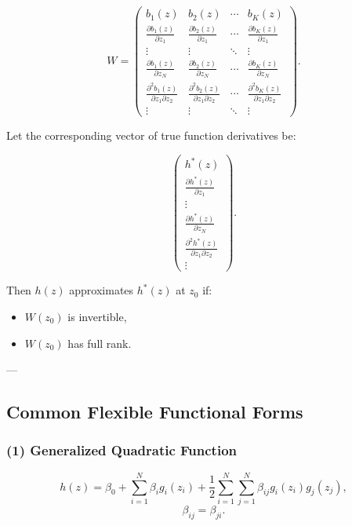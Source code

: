 \[
W =
\begin{pmatrix}
b_1(z) & b_2(z) & \cdots & b_K(z) \\
\frac{\partial b_1(z)}{\partial z_1} & \frac{\partial b_2(z)}{\partial z_1} & \cdots & \frac{\partial b_K(z)}{\partial z_1} \\
\vdots & \vdots & \ddots & \vdots \\
\frac{\partial b_1(z)}{\partial z_N} & \frac{\partial b_2(z)}{\partial z_N} & \cdots & \frac{\partial b_K(z)}{\partial z_N} \\
\frac{\partial^2 b_1(z)}{\partial z_1 \partial z_2} & \frac{\partial^2 b_2(z)}{\partial z_1 \partial z_2} & \cdots & \frac{\partial^2 b_K(z)}{\partial z_1 \partial z_2} \\
\vdots & \vdots & \ddots & \vdots
\end{pmatrix}.
\]

Let the corresponding vector of true function derivatives be:

\[
\begin{pmatrix}
h^*(z) \\
\frac{\partial h^*(z)}{\partial z_1} \\
\vdots \\
\frac{\partial h^*(z)}{\partial z_N} \\
\frac{\partial^2 h^*(z)}{\partial z_1 \partial z_2} \\
\vdots
\end{pmatrix}.
\]

Then $h(z)$ approximates $h^*(z)$ at $z_0$ if:

\begin{itemize}
\item $W(z_0)$ is invertible,
\item $W(z_0)$ has full rank.
\end{itemize}

---

\subsection*{Common Flexible Functional Forms}

\subsubsection*{(1) Generalized Quadratic Function}

\[
h(z)
=
\beta_0
+
\sum_{i=1}^N \beta_i g_i(z_i)
+
\frac{1}{2}
\sum_{i=1}^N \sum_{j=1}^N
\beta_{ij} g_i(z_i) g_j(z_j),
\]
\[
\beta_{ij} = \beta_{ji}.
\]

